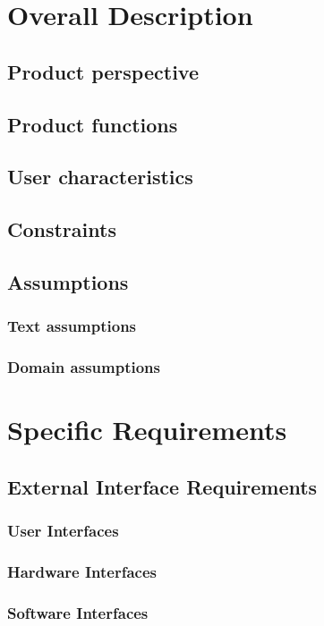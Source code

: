 \documentclass[11pt,a4paper]{report}
\begin{document}
\chapter{Overall Description}
\section{Product perspective}
\section{Product functions}
\section{User characteristics}
\section{Constraints}
\section{Assumptions}
\subsection{Text assumptions}
\subsection{Domain assumptions}
\chapter{Specific Requirements}
\section{External Interface Requirements}
\subsection{User Interfaces}
\subsection{Hardware Interfaces}
\subsection{Software Interfaces}
\end{document}
